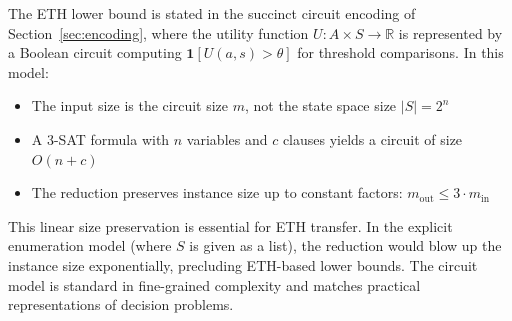 \begin{remark}
The ETH lower bound is stated in the succinct circuit encoding of Section~\ref{sec:encoding}, where the utility function $U: A \times S \to \mathbb{R}$ is represented by a Boolean circuit computing $\mathbf{1}[U(a,s) > \theta]$ for threshold comparisons. In this model:
\begin{itemize}
\item The input size is the circuit size $m$, not the state space size $|S| = 2^n$
\item A 3-SAT formula with $n$ variables and $c$ clauses yields a circuit of size $O(n + c)$
\item The reduction preserves instance size up to constant factors: $m_{\text{out}} \leq 3 \cdot m_{\text{in}}$
\end{itemize}
This linear size preservation is essential for ETH transfer. In the explicit enumeration model (where $S$ is given as a list), the reduction would blow up the instance size exponentially, precluding ETH-based lower bounds. The circuit model is standard in fine-grained complexity and matches practical representations of decision problems.
\end{remark}
